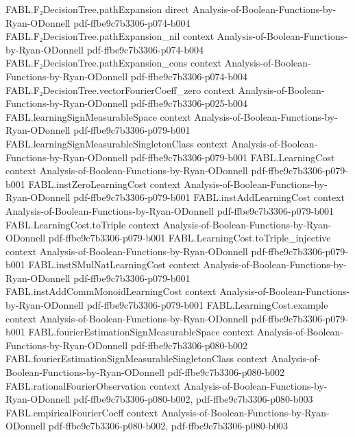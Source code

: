 \begin{theorem}
\proofstep
  {FABL.F₂DecisionTree.pathExpansion}
  {direct}
  {Analysis-of-Boolean-Functions-by-Ryan-ODonnell}
  {pdf-ffbe9c7b3306-p074-b004}
\proofstep
  {FABL.F₂DecisionTree.pathExpansion_nil}
  {context}
  {Analysis-of-Boolean-Functions-by-Ryan-ODonnell}
  {pdf-ffbe9c7b3306-p074-b004}
\proofstep
  {FABL.F₂DecisionTree.pathExpansion_cons}
  {context}
  {Analysis-of-Boolean-Functions-by-Ryan-ODonnell}
  {pdf-ffbe9c7b3306-p074-b004}
\proofstep
  {FABL.F₂DecisionTree.vectorFourierCoeff_zero}
  {context}
  {Analysis-of-Boolean-Functions-by-Ryan-ODonnell}
  {pdf-ffbe9c7b3306-p025-b004}
\proofstep
  {FABL.learningSignMeasurableSpace}
  {context}
  {Analysis-of-Boolean-Functions-by-Ryan-ODonnell}
  {pdf-ffbe9c7b3306-p079-b001}
\proofstep
  {FABL.learningSignMeasurableSingletonClass}
  {context}
  {Analysis-of-Boolean-Functions-by-Ryan-ODonnell}
  {pdf-ffbe9c7b3306-p079-b001}
\proofstep
  {FABL.LearningCost}
  {context}
  {Analysis-of-Boolean-Functions-by-Ryan-ODonnell}
  {pdf-ffbe9c7b3306-p079-b001}
\proofstep
  {FABL.instZeroLearningCost}
  {context}
  {Analysis-of-Boolean-Functions-by-Ryan-ODonnell}
  {pdf-ffbe9c7b3306-p079-b001}
\proofstep
  {FABL.instAddLearningCost}
  {context}
  {Analysis-of-Boolean-Functions-by-Ryan-ODonnell}
  {pdf-ffbe9c7b3306-p079-b001}
\proofstep
  {FABL.LearningCost.toTriple}
  {context}
  {Analysis-of-Boolean-Functions-by-Ryan-ODonnell}
  {pdf-ffbe9c7b3306-p079-b001}
\proofstep
  {FABL.LearningCost.toTriple_injective}
  {context}
  {Analysis-of-Boolean-Functions-by-Ryan-ODonnell}
  {pdf-ffbe9c7b3306-p079-b001}
\proofstep
  {FABL.instSMulNatLearningCost}
  {context}
  {Analysis-of-Boolean-Functions-by-Ryan-ODonnell}
  {pdf-ffbe9c7b3306-p079-b001}
\proofstep
  {FABL.instAddCommMonoidLearningCost}
  {context}
  {Analysis-of-Boolean-Functions-by-Ryan-ODonnell}
  {pdf-ffbe9c7b3306-p079-b001}
\proofstep
  {FABL.LearningCost.example}
  {context}
  {Analysis-of-Boolean-Functions-by-Ryan-ODonnell}
  {pdf-ffbe9c7b3306-p079-b001}
\proofstep
  {FABL.fourierEstimationSignMeasurableSpace}
  {context}
  {Analysis-of-Boolean-Functions-by-Ryan-ODonnell}
  {pdf-ffbe9c7b3306-p080-b002}
\proofstep
  {FABL.fourierEstimationSignMeasurableSingletonClass}
  {context}
  {Analysis-of-Boolean-Functions-by-Ryan-ODonnell}
  {pdf-ffbe9c7b3306-p080-b002}
\proofstep
  {FABL.rationalFourierObservation}
  {context}
  {Analysis-of-Boolean-Functions-by-Ryan-ODonnell}
  {pdf-ffbe9c7b3306-p080-b002,
    pdf-ffbe9c7b3306-p080-b003}
\proofstep
  {FABL.empiricalFourierCoeff}
  {context}
  {Analysis-of-Boolean-Functions-by-Ryan-ODonnell}
  {pdf-ffbe9c7b3306-p080-b002,
    pdf-ffbe9c7b3306-p080-b003}

\end{theorem}
